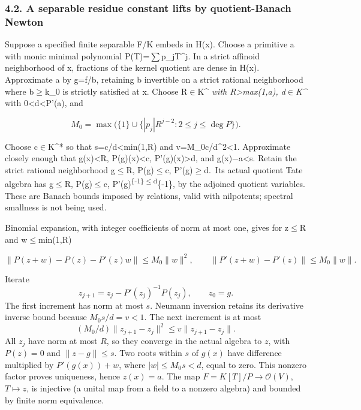 \documentclass[
  10pt,
]{article}
\begin{document}
\subsubsection{4.2. A separable residue constant lifts by
quotient-Banach
Newton}\label{a-separable-residue-constant-lifts-by-quotient-banach-newton}

Suppose a specified finite separable F/K embeds in H(x). Choose a
primitive a with monic minimal polynomial P(T)=\ensuremath{\sum}p\_jT\^{}j. In a strict
affinoid neighborhood of x, fractions of the kernel quotient are dense
in H(x). Approximate a by g=f/b, retaining b invertible on a strict
rational neighborhood where \textbar b\textbar\ensuremath{\ge}\textbar k\_0\textbar{}
is strictly satisfied at x. Choose R\ensuremath{\in}\textbar K\^{}\emph{\textbar{} with
R\textgreater max(1,\textbar a\textbar), d\ensuremath{\in}\textbar K\^{}}\textbar{}
with 0\textless d\textless\textbar P'(a)\textbar, and

\[
 M_0=\max\bigl(\{1\}\cup\{|p_j|R^{j-2}:2\le j\le\deg P\}\bigr).
\]

Choose c\ensuremath{\in}\textbar K\^{}*\textbar{} so that s=c/d\textless min(1,R) and
v=M\_0c/d\^{}2\textless1. Approximate closely enough that
\textbar g(x)\textbar\textless R, \textbar P(g)(x)\textbar\textless c,
\textbar P'(g)(x)\textbar\textgreater d, and
\textbar g(x)\ensuremath{-}a\textbar\textless s. Retain the strict rational
neighborhood \textbar g\textbar\ensuremath{\le}R, \textbar P(g)\textbar\ensuremath{\le}c,
\textbar P'(g)\textbar\ensuremath{\ge}d.~Its actual quotient Tate algebra has
\textbar\textbar g\textbar\textbar\ensuremath{\le}R,
\textbar\textbar P(g)\textbar\textbar\ensuremath{\le}c,
\textbar\textbar P'(g)\textsuperscript{\{-1\}\textbar\textbar\ensuremath{\le}d}\{-1\},
by the adjoined quotient variables. These are Banach bounds imposed by
relations, valid with nilpotents; spectral smallness is not being used.

Binomial expansion, with integer coefficients of norm at most one, gives
for \textbar\textbar z\textbar\textbar\ensuremath{\le}R and
\textbar\textbar w\textbar\textbar\ensuremath{\le}min(1,R)

\[
 \|P(z+w)-P(z)-P'(z)w\|\le M_0\|w\|^2,
 \qquad\|P'(z+w)-P'(z)\|\le M_0\|w\|.
\]

Iterate
\[
 z_{j+1}=z_j-P'(z_j)^{-1}P(z_j),\qquad z_0=g.
\]
The first increment has norm at most \(s\). Neumann inversion retains
its derivative inverse bound because \(M_0s/d=v<1\). The next
increment is at most
\[
 (M_0/d)\|z_{j+1}-z_j\|^2\le v\|z_{j+1}-z_j\|.
\]
All \(z_j\) have norm at most \(R\), so they converge in the actual
algebra to \(z\), with \(P(z)=0\) and \(\|z-g\|\le s\).
Two roots within \(s\) of \(g(x)\) have difference multiplied by
\(P'(g(x))+w\), where \(|w|\le M_0s<d\), equal to zero.
This nonzero factor proves uniqueness, hence \(z(x)=a\).
The map \(F=K[T]/P\to\mathcal{O}(V)\), \(T\mapsto z\), is
injective (a unital map from a field to a nonzero algebra) and bounded
by finite norm equivalence.
\end{document}
